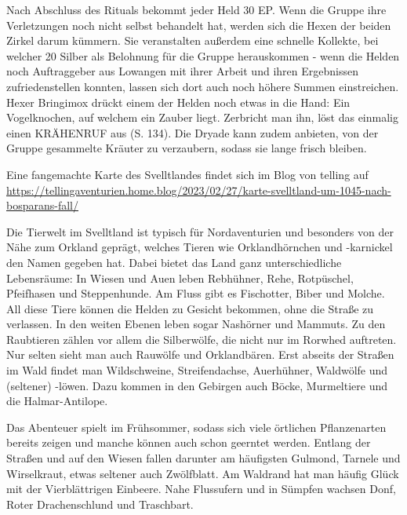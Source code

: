 
Nach Abschluss des Rituals bekommt jeder Held 30 EP. Wenn die Gruppe ihre Verletzungen noch nicht selbst behandelt hat, werden sich die Hexen der beiden Zirkel darum kümmern. Sie veranstalten außerdem eine schnelle Kollekte, bei welcher 20 Silber als Belohnung für die Gruppe herauskommen - wenn die Helden noch Auftraggeber aus Lowangen mit ihrer Arbeit und ihren Ergebnissen zufriedenstellen konnten, lassen sich dort auch noch höhere Summen einstreichen. 
Hexer Bringimox drückt einem der Helden noch etwas in die Hand: Ein Vogelknochen, auf welchem ein Zauber liegt. Zerbricht man ihn, löst das einmalig einen KRÄHENRUF aus (S. 134). Die Dryade kann zudem anbieten, von der Gruppe gesammelte Kräuter zu verzaubern, sodass sie lange frisch bleiben.













Eine fangemachte Karte des Svelltlandes findet sich im Blog von telling auf \url{https://tellingaventurien.home.blog/2023/02/27/karte-svelltland-um-1045-nach-bosparans-fall/}

Die Tierwelt im Svelltland ist typisch für Nordaventurien und besonders von der Nähe zum Orkland geprägt, welches Tieren wie Orklandhörnchen und -karnickel den Namen gegeben hat. Dabei bietet das Land ganz unterschiedliche Lebensräume: In Wiesen und Auen leben Rebhühner, Rehe, Rotpüschel, Pfeifhasen und Steppenhunde. Am Fluss gibt es Fischotter, Biber und Molche. All diese Tiere können die Helden zu Gesicht bekommen, ohne die Straße zu verlassen. In den weiten Ebenen leben sogar Nashörner und Mammuts.
Zu den Raubtieren zählen vor allem die Silberwölfe, die nicht nur im Rorwhed auftreten. Nur selten sieht man auch Rauwölfe und Orklandbären.
Erst abseits der Straßen im Wald findet man Wildschweine, Streifendachse, Auerhühner, Waldwölfe und (seltener) -löwen. Dazu kommen in den Gebirgen auch Böcke, Murmeltiere und die Halmar-Antilope.

Das Abenteuer spielt im Frühsommer, sodass sich viele örtlichen Pflanzenarten bereits zeigen und manche können auch schon geerntet werden. Entlang der Straßen und auf den Wiesen fallen darunter am häufigsten Gulmond, Tarnele und Wirselkraut, etwas seltener auch Zwölfblatt.
Am Waldrand hat man häufig Glück mit der Vierblättrigen Einbeere.
Nahe Flussufern und in Sümpfen wachsen Donf, Roter Drachenschlund und Traschbart.


